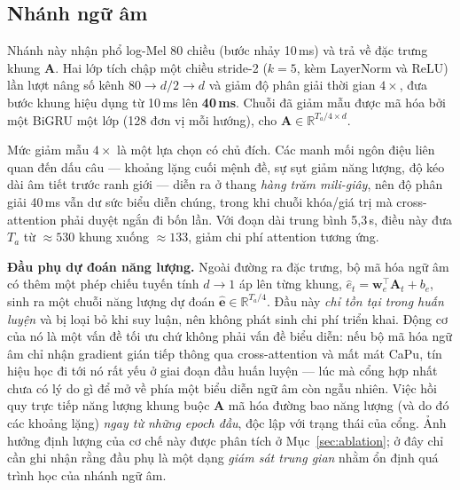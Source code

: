 \documentclass[conference,onecolumn]{IEEEtran}
\begin{document}
\subsection{Nhánh ngữ âm}
\label{sec:audio}
Nhánh này nhận phổ log-Mel 80 chiều (bước nhảy 10\,ms) và trả về đặc trưng khung
$\mathbf{A}$. Hai lớp tích chập một chiều stride-2 ($k=5$, kèm LayerNorm và ReLU)
lần lượt nâng số kênh $80\!\to\!d/2\!\to\!d$ và giảm độ phân giải thời gian
$4\times$, đưa bước khung hiệu dụng từ 10\,ms lên \textbf{40\,ms}. Chuỗi đã giảm
mẫu được mã hóa bởi một BiGRU một lớp (128 đơn vị mỗi hướng), cho
$\mathbf{A}\in\mathbb{R}^{T_a/4\times d}$.

Mức giảm mẫu $4\times$ là một lựa chọn có chủ đích. Các manh mối ngôn điệu liên
quan đến dấu câu --- khoảng lặng cuối mệnh đề, sự sụt giảm năng lượng, độ kéo dài
âm tiết trước ranh giới --- diễn ra ở thang \emph{hàng trăm mili-giây}, nên độ phân
giải 40\,ms vẫn dư sức biểu diễn chúng, trong khi chuỗi khóa/giá trị mà
cross-attention phải duyệt ngắn đi bốn lần. Với đoạn dài trung bình 5{,}3\,s, điều
này đưa $T_a$ từ $\approx530$ khung xuống $\approx133$, giảm chi phí attention
tương ứng.

\textbf{Đầu phụ dự đoán năng lượng.} Ngoài đường ra đặc trưng, bộ mã hóa ngữ âm có
thêm một phép chiếu tuyến tính $d\!\rightarrow\!1$ áp lên từng khung,
$\hat{e}_t = \mathbf{w}_e^{\top}\mathbf{A}_t + b_e$, sinh ra một chuỗi năng lượng
dự đoán $\hat{\mathbf{e}}\in\mathbb{R}^{T_a/4}$. Đầu này \emph{chỉ tồn tại trong
huấn luyện} và bị loại bỏ khi suy luận, nên không phát sinh chi phí triển khai.
Động cơ của nó là một vấn đề tối ưu chứ không phải vấn đề biểu diễn: nếu bộ mã hóa
ngữ âm chỉ nhận gradient gián tiếp thông qua cross-attention và mất mát CaPu, tín
hiệu học đi tới nó rất yếu ở giai đoạn đầu huấn luyện --- lúc mà cổng hợp nhất chưa
có lý do gì để mở về phía một biểu diễn ngữ âm còn ngẫu nhiên. Việc hồi quy trực
tiếp năng lượng khung buộc $\mathbf{A}$ mã hóa đường bao năng lượng (và do đó các
khoảng lặng) \emph{ngay từ những epoch đầu}, độc lập với trạng thái của cổng. Ảnh
hưởng định lượng của cơ chế này được phân tích ở Mục~\ref{sec:ablation}; ở đây chỉ
cần ghi nhận rằng đầu phụ là một dạng \emph{giám sát trung gian} nhằm ổn định quá
trình học của nhánh ngữ âm.
\end{document}
